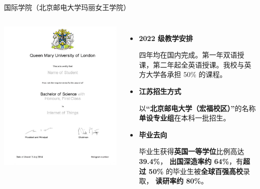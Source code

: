 \documentclass[aspectratio=169, utf8, fontset=windows]{beamer}
\begin{document}
\begin{frame}{国际学院（北京邮电大学玛丽女王学院）}
\begin{columns}
        \includegraphics[width=\textwidth]{./resources/17.png}

        \footnotesize
        \begin{itemize}
            \item \textcolor{Fore}{\textbf{2022 级教学安排}}

                  四年均在国内完成。第一年双语授课，第二年起全英语授课。我校与英方大学各承担 50\% 的课程。

            \item \textcolor{Fore}{\textbf{江苏招生方式}}

                  以\textcolor{Fore}{\textbf{“北京邮电大学（宏福校区）”}}的名称\textcolor{Fore}{\textbf{单设专业组}}在本科一批招生。

            \item \textcolor{Fore}{\textbf{毕业去向}}

                  毕业生获得\textcolor{Fore}{\textbf{英国一等学位}}比例高达 \textcolor{Fore}{\textbf{39.4\%}}，
                  \textcolor{Fore}{\textbf{出国深造率约 64\%}}，有\textcolor{Fore}{\textbf{超过 50\%}} 的毕业生被\textcolor{Fore}{\textbf{全球百强高校}}录取，
                  \textcolor{Fore}{\textbf{读研率约 80\%}}。
        \end{itemize}
    \end{columns}
\end{frame}
\end{document}
